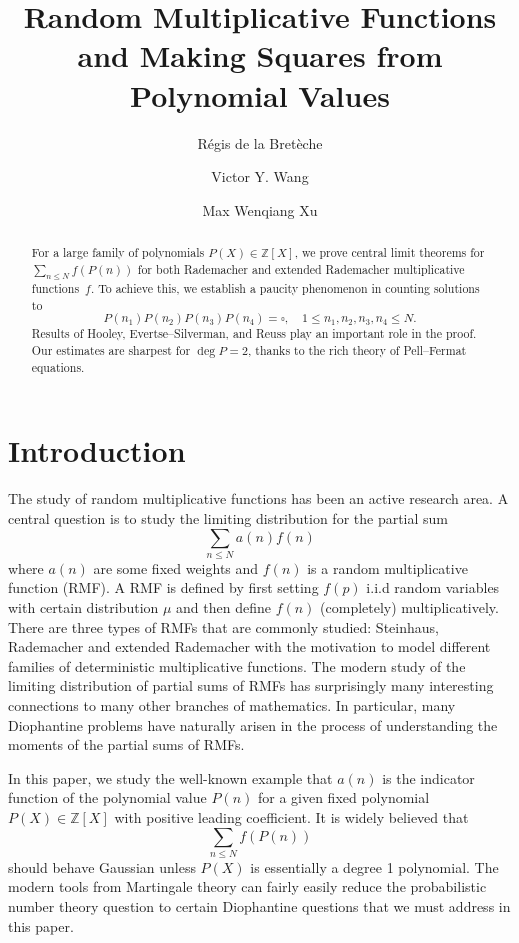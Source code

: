 \documentclass[reqno, 12pt]{amsart}
\title[ RMF and Making Squares  ]{Random Multiplicative Functions and Making Squares from Polynomial Values}
\author{R\'egis de la Bret\`eche}
\author{Victor Y. Wang}
\author{Max Wenqiang Xu}
\date{}
\theoremstyle{plain}
\theoremstyle{definition}
\theoremstyle{remark}
\renewcommand{\le}{\leqslant}
\begin{document}
\begin{abstract} 
For a large family of polynomials $P(X)\in \mathbb{Z}[X]$, 
we prove central limit theorems for $\sum_{n\le N} f(P(n))$ for both Rademacher and extended Rademacher multiplicative functions~$f$. To achieve this, we establish a paucity phenomenon in counting solutions to
\[P(n_1)P(n_2)P(n_3)P(n_4) = \square,  \quad 1\le n_1, n_2, n_3, n_4 \le N.\]
Results of Hooley, Evertse--Silverman, and Reuss
play an important role in the proof.
Our estimates are sharpest for $\deg P = 2$,
thanks to the rich theory of Pell--Fermat equations.
\end{abstract}
 

\maketitle 

\setcounter{tocdepth}{1}
\tableofcontents
\setcounter{tocdepth}{3}


\section{Introduction}
\label{intro}

The study of random multiplicative functions has been an active research area. A central question is to study the limiting distribution for the partial sum 
\[\sum_{n\le N} a(n)f(n)\]
where $a(n)$ are some fixed weights and $f(n)$ is a random multiplicative function (RMF). A RMF is defined by first setting $f(p)$ i.i.d random variables with certain distribution $\mu$ and then define $f(n)$ (completely) multiplicatively.
There are three types of RMFs that are commonly studied: Steinhaus, Rademacher and extended Rademacher with the motivation to model different families of deterministic multiplicative functions. The modern study of the limiting distribution of partial sums of RMFs has surprisingly   many interesting connections to many other branches of mathematics.
In particular, many Diophantine problems have naturally arisen in the process of understanding the moments of the partial sums of RMFs.

In this paper, we study the well-known example that $a(n)$ is the indicator function of the polynomial value $P(n)$ for a given fixed polynomial $P(X)\in \mathbb{Z}[X]$
with positive leading coefficient.
It is widely believed that 
\[\sum_{n\le N } f(P(n)) \]
should behave Gaussian unless $P(X)$ is essentially a degree 1 polynomial. 
The modern tools from Martingale theory can fairly easily reduce the probabilistic number theory question to certain Diophantine questions that we must address in this paper.
\end{document}
